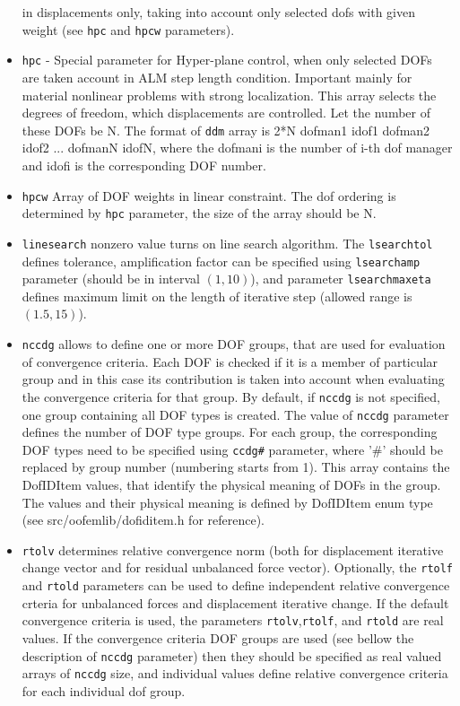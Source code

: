 \documentclass[a4paper]{report}
\newcommand{\param}[1]{\texttt{#1}} %
\begin{document}
\begin{itemize}
in displacements only, taking into account only selected dofs with
given weight (see \param{hpc} and \param{hpcw} parameters).
\item \param{hpc} - Special parameter for Hyper-plane control, when only
selected DOFs are taken account in ALM step length
condition. Important mainly for material nonlinear problems with
strong localization. This array selects the degrees of freedom,
which displacements are controlled. Let the number of these DOFs be N.
The format of \param{ddm} array is 2*N dofman1 idof1
dofman2 idof2 ... dofmanN idofN, where the dofmani is the number of i-th dof manager  and idofi is the
corresponding DOF number.
\item \param{hpcw} Array of DOF weights in linear constraint. The
dof ordering is determined by \param{hpc} parameter, the size of the array should
be N.
\item \param{linesearch} nonzero value turns on line search
  algorithm. The \param{lsearchtol} defines tolerance, amplification
  factor can be specified using \param{lsearchamp} parameter (should
  be in interval $(1,10)$), and parameter \param{lsearchmaxeta}
  defines maximum limit on the length of iterative step (allowed range
  is $(1.5,15)$).
\item \param{nccdg} allows to define one or more DOF groups, that are used for evaluation of convergence criteria. Each DOF is checked if it is a member of particular group and in this case its contribution is taken into account when evaluating the convergence criteria for that group. By default, if \param{nccdg} is not specified, one group containing all DOF types is created. The value of \param{nccdg} parameter defines the number of DOF type groups. For each group, the corresponding DOF types need to be specified using \param{ccdg\#} parameter, where '\#' should be replaced by group number (numbering starts from 1). This array contains the DofIDItem values, that identify the physical meaning of DOFs in the group. The values and their physical meaning is defined by DofIDItem enum type (see src/oofemlib/dofiditem.h for reference).
\item \param{rtolv} determines relative convergence norm (both for displacement
iterative change vector and for residual unbalanced force vector). Optionally, the \param{rtolf} and \param{rtold} parameters can be used to define
independent relative convergence crteria for unbalanced forces and displacement
iterative change. If the default convergence criteria is used,
the parameters \param{rtolv},\param{rtolf}, and \param{rtold} are real values. If the convergence criteria DOF groups are used (see bellow the description of \param{nccdg} parameter) then they should be specified as real valued arrays of \param{nccdg} size, and individual values define relative convergence criteria for each individual dof group.

\end{itemize}
\end{document}
